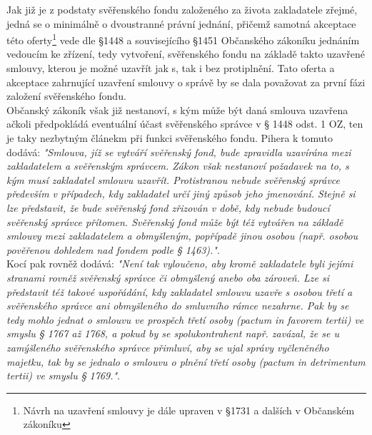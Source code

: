 \documentclass{article}
\begin{document}

Jak již je z podstaty svěřenského fondu založeného za života zakladatele zřejmé, jedná se o minimálně o dvoustranné právní jednání, přičemž samotná akceptace této oferty\footnote{Návrh na uzavření smlouvy je dále upraven v §1731 a dalších v Občanském zákoníku} vede dle §1448 a souvisejícího §1451 Občanského zákoníku jednáním vedoucím ke zřízení, tedy vytvoření, svěřenského fondu na základě takto uzavřené smlouvy, kterou je možné uzavřít jak s, tak i bez protiplnění. Tato oferta a akceptace zahrnující uzavření smlouvy o správě by se dala považovat za první fázi založení svěřenského fondu.\\ 

Občanský zákoník však již nestanoví, s kým může být daná smlouva uzavřena ačkoli předpokládá eventuální účast svěřenského správce v § 1448 odst. 1 OZ, ten je taky nezbytným článekm při funkci svěřenského fondu. Pihera k tomuto dodává: \textit{"Smlouva, jíž se vytváří svěřenský fond, bude zpravidla uzavírána mezi zakladatelem a svěřenským správcem. Zákon však nestanoví požadavek na to, s kým musí zakladatel smlouvu uzavřít. Protistranou nebude svěřenský správce především v případech, kdy zakladatel určí jiný způsob jeho jmenování. Stejně si lze představit, že bude svěřenský fond zřizován v době, kdy nebude budoucí svěřenský správce přítomen. Svěřenský fond může být též vytvářen na základě smlouvy mezi zakladatelem a obmyšleným, popřípadě jinou osobou (např. osobou pověřenou dohledem nad fondem podle § 1463)."}.\\

Kocí pak rovněž dodává: \textit{"Není tak vyloučeno, aby kromě zakladatele byli jejími stranami rovněž svěřenský správce či obmyšlený anebo oba zároveň. Lze si představit též takové uspořádání, kdy zakladatel smlouvu uzavře s osobou třetí a svěřenského správce ani obmyšleného do smluvního rámce nezahrne. Pak by se tedy mohlo jednat o smlouvu ve prospěch třetí osoby (pactum in favorem tertii) ve smyslu § 1767 až 1768, a pokud by se spolukontrahent např. zavázal, že se u zamýšleného svěřenského správce přimluví, aby se ujal správy vyčleněného majetku, tak by se jednalo o smlouvu o plnění třetí osoby (pactum in detrimentum tertii) ve smyslu § 1769."}.\\
\end{document}
